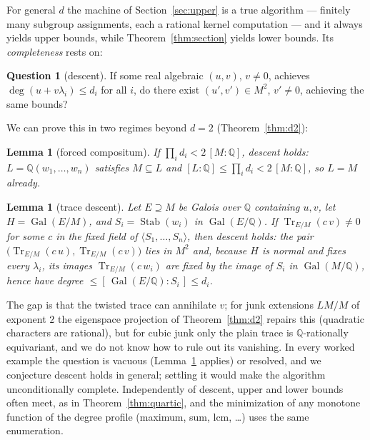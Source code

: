 \documentclass[11pt]{article}
\newtheorem{lemma}[theorem]{Lemma}
\theoremstyle{definition}
\newtheorem{question}[theorem]{Question}
\theoremstyle{remark}
\newcommand{\Q}{\mathbb{Q}}
\newcommand{\Gal}{\operatorname{Gal}}
\begin{document}
For general $d$ the machine of Section~\ref{sec:upper} is a true algorithm --- finitely many
subgroup assignments, each a rational kernel computation --- and it always yields upper bounds,
while Theorem~\ref{thm:section} yields lower bounds. Its \emph{completeness} rests on:

\begin{question}[descent]\label{q:descent}
If some real algebraic $(u, v)$, $v \neq 0$, achieves $\deg(u + v\lambda_i) \le d_i$ for all
$i$, do there exist $(u', v') \in M^2$, $v' \neq 0$, achieving the same bounds?
\end{question}

We can prove this in two regimes beyond $d = 2$ (Theorem~\ref{thm:d2}):

\begin{lemma}[forced compositum]\label{lem:forced}
If $\prod_i d_i < 2\,[M : \Q]$, descent holds: $L = \Q(w_1, \dots, w_n)$ satisfies
$M \subseteq L$ and $[L : \Q] \le \prod_i d_i < 2\,[M:\Q]$, so $L = M$ already.
\end{lemma}

\begin{lemma}[trace descent]\label{lem:trace}
Let $E \supseteq M$ be Galois over $\Q$ containing $u, v$, let $H = \Gal(E/M)$, and
$S_i = \operatorname{Stab}(w_i)$ in $\Gal(E/\Q)$. If
$\operatorname{Tr}_{E/M}(c\,v) \neq 0$ for some $c$ in the fixed field of
$\langle S_1, \dots, S_n \rangle$, then descent holds: the pair
$\bigl(\operatorname{Tr}_{E/M}(c\,u), \operatorname{Tr}_{E/M}(c\,v)\bigr)$ lies in $M^2$ and,
because $H$ is normal and fixes every $\lambda_i$, its images
$\operatorname{Tr}_{E/M}(c\,w_i)$ are fixed by the image of $S_i$ in $\Gal(M/\Q)$, hence have
degree $\le [\,\Gal(E/\Q) : S_i\,] \le d_i$.
\end{lemma}

The gap is that the twisted trace can annihilate $v$; for junk extensions $L M / M$ of
exponent $2$ the eigenspace projection of Theorem~\ref{thm:d2} repairs this (quadratic
characters are rational), but for cubic junk only the plain trace is $\Q$-rationally
equivariant, and we do not know how to rule out its vanishing. In every worked example the
question is vacuous (Lemma~\ref{lem:forced} applies) or resolved, and we conjecture descent
holds in general; settling it would make the algorithm unconditionally complete. Independently
of descent, upper and lower bounds often meet, as in Theorem~\ref{thm:quartic}, and the
minimization of any monotone function of the degree profile (maximum, sum, lcm, \dots) uses the
same enumeration.
\end{document}
